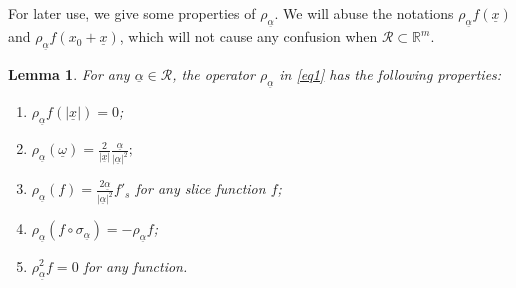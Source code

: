 \documentclass{amsart}
\newtheorem{lemma}[theorem]{Lemma}
\theoremstyle{definition}
\theoremstyle{remark}
\numberwithin{equation}{section}
\begin{document}
For later use, we give some properties of $\rho_{\underline\alpha}$. We will abuse the notations $\rho_{\underline\alpha}f(\underline{x})$  and $\rho_{\underline\alpha}f(x_{0}+\underline{x})$, which will not cause any confusion when $\mathscr{R}\subset \mathbb{R}^{m}$.
\begin{lemma} \label{rp1}
For any $\underline{\alpha}\in \mathscr{R}$,  the operator $\rho_{\underline\alpha}$ in \eqref{eq1} has the following properties:
    \begin{enumerate}
    \item $\displaystyle \rho_{\underline\alpha} f(|\underline{x}|)=0$;
   \item $\displaystyle
   \rho_{\underline\alpha}(\underline\omega)=\frac{2}{|\underline x|}\frac{\underline{\alpha}}{|\underline{\alpha}|^2};
 $
   \item $\displaystyle \rho_{\underline\alpha} (f)=\frac{2\underline{\alpha}}{|\underline{\alpha}|^2}f'_s$ for any slice function $f$;
   \item %
   $\rho_{\underline{\alpha}}(f\circ\sigma_{\underline{\alpha}})=-\rho_{\underline{\alpha}}f$;
    \item $\displaystyle \rho_{\underline\alpha}^2f=0$ for any function.
\end{enumerate}
\end{lemma}
\end{document}
